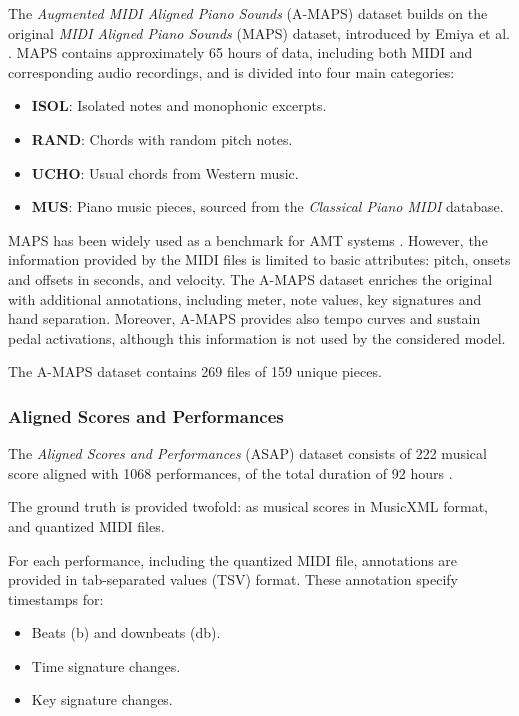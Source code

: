 The \emph{Augmented MIDI Aligned Piano Sounds} (A-MAPS) dataset builds on the original \emph{MIDI Aligned Piano Sounds} (MAPS) dataset, introduced by Emiya et al. \cite{Emiya2010}. MAPS contains approximately 65 hours of data, including both MIDI and corresponding audio recordings, and is divided into four main categories:\begin{itemize}
	\item \textbf{ISOL}: Isolated notes and monophonic excerpts.
	\item \textbf{RAND}: Chords with random pitch notes.
	\item \textbf{UCHO}: Usual chords from Western music.
	\item \textbf{MUS}: Piano music pieces, sourced from the \emph{Classical Piano MIDI} database. \end{itemize}

MAPS has been widely used as a benchmark for AMT systems \cite{Ycart2018}. However, the information provided by the MIDI files is limited to basic attributes: pitch, onsets and offsets in seconds, and velocity. The A-MAPS dataset enriches the original with additional annotations, including meter, note values, key signatures and hand separation. Moreover, A-MAPS provides also tempo curves and sustain pedal activations, although this information is not used by the considered model.

The A-MAPS dataset contains 269 files of 159 unique pieces.

\subsubsection{Aligned Scores and Performances}

The \emph{Aligned Scores and Performances} (ASAP) dataset consists of 222 musical score aligned with 1068 performances, of the total duration of 92 hours \cite{Foscarin2020}.

The ground truth is provided twofold: as musical scores in MusicXML format, and quantized MIDI files.

For each performance, including the quantized MIDI file, annotations are provided in tab-separated values (TSV) format. These annotation specify timestamps for: \begin{itemize}
	\item Beats (b) and downbeats (db).
	\item Time signature changes.
	\item Key signature changes.
\end{itemize}

